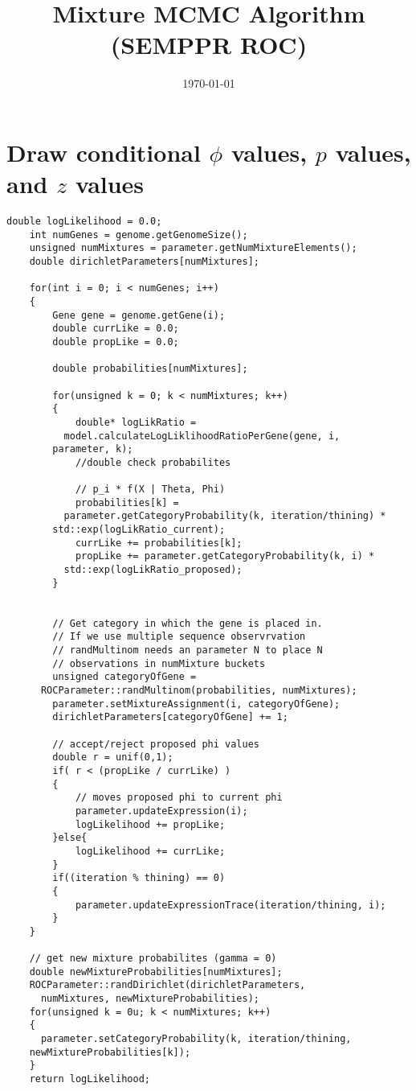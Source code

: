 \documentclass[11pt]{article}
\begin{document}
  \title{Mixture MCMC Algorithm (SEMPPR ROC)}
  \date{\today}
  \maketitle
  
  \section{Draw conditional $\phi$ values, $p$ values, and $z$ values}
  
  \begin{lstlisting}[frame=single]
    double logLikelihood = 0.0;
    int numGenes = genome.getGenomeSize();
    unsigned numMixtures = parameter.getNumMixtureElements();
    double dirichletParameters[numMixtures];
    
    for(int i = 0; i < numGenes; i++)
    {
        Gene gene = genome.getGene(i);
        double currLike = 0.0;
        double propLike = 0.0;

        double probabilities[numMixtures];

        for(unsigned k = 0; k < numMixtures; k++)
        {
            double* logLikRatio = 
	      model.calculateLogLiklihoodRatioPerGene(gene, i, 
		parameter, k);
            //double check probabilites
            
            // p_i * f(X | Theta, Phi)
            probabilities[k] = 
	      parameter.getCategoryProbability(k, iteration/thining) * 
		std::exp(logLikRatio_current);
            currLike += probabilities[k];
            propLike += parameter.getCategoryProbability(k, i) * 
	      std::exp(logLikRatio_proposed);
        }


        // Get category in which the gene is placed in.
        // If we use multiple sequence observrvation 
        // randMultinom needs an parameter N to place N 
        // observations in numMixture buckets
        unsigned categoryOfGene = 
	  ROCParameter::randMultinom(probabilities, numMixtures);
        parameter.setMixtureAssignment(i, categoryOfGene);
        dirichletParameters[categoryOfGene] += 1;

        // accept/reject proposed phi values
        double r = unif(0,1);
        if( r < (propLike / currLike) )
        {
            // moves proposed phi to current phi
            parameter.updateExpression(i);
            logLikelihood += propLike;
        }else{
            logLikelihood += currLike;
        }
        if((iteration % thining) == 0)
        {
            parameter.updateExpressionTrace(iteration/thining, i);
        }
    }
    
    // get new mixture probabilites (gamma = 0)
    double newMixtureProbabilities[numMixtures];
    ROCParameter::randDirichlet(dirichletParameters, 
      numMixtures, newMixtureProbabilities);
    for(unsigned k = 0u; k < numMixtures; k++)
    {
      parameter.setCategoryProbability(k, iteration/thining, 
	newMixtureProbabilities[k]);
    }
    return logLikelihood;
  \end{lstlisting}
\end{document}
